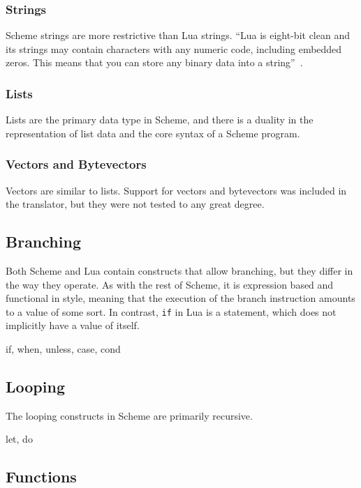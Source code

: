 \subsubsection{Strings}

Scheme strings are more restrictive than Lua strings. ``Lua is
eight-bit clean and its strings may contain characters with any numeric code,
including embedded zeros. This means that you can store any binary data into a
string''~\cite[p.11]{luabook}.

\subsubsection{Lists}

Lists are the primary data type in Scheme, and there is a duality in the
representation of list data and the core syntax of a Scheme program.

\subsubsection{Vectors and Bytevectors}

Vectors are similar to lists. Support for vectors and bytevectors was included
in the translator, but they were not tested to any great degree.

\subsection{Branching}

Both Scheme and Lua contain constructs that allow branching, but they differ in
the way they operate. As with the rest of Scheme, it is expression based and
functional in style, meaning that the execution of the branch instruction
amounts to a value of some sort. In contrast, \texttt{if} in Lua is a statement,
which does not implicitly have a value of itself.

if, when, unless, case, cond

\subsection{Looping}

The looping constructs in Scheme are primarily recursive.

let, do

\subsection{Functions}

